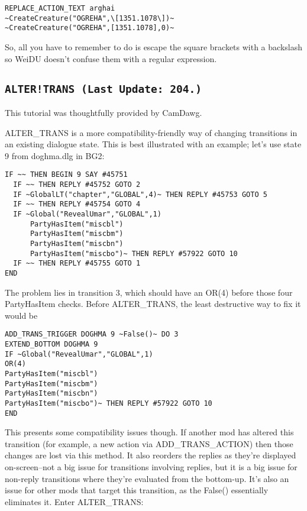 \documentclass{article}
\begin{document}
\begin{verbatim}
REPLACE_ACTION_TEXT arghai
~CreateCreature("OGREHA",\[1351.1078\])~
~CreateCreature("OGREHA",[1351.1078],0)~
\end{verbatim}

So, all you have to remember to do is escape the square brackets with a
backslash so WeiDU doesn't confuse them with a regular expression.

\label{sec-alter-trans}\subsection{\tt{ALTER!TRANS} (Last Update: 204.)}
This tutorial was thoughtfully provided by CamDawg.

ALTER_TRANS is a more compatibility-friendly way of changing transitions in an existing dialogue state. This is best illustrated with an example; let's use state 9 from doghma.dlg in BG2:

\begin{verbatim}
IF ~~ THEN BEGIN 9 SAY #45751
  IF ~~ THEN REPLY #45752 GOTO 2
  IF ~GlobalLT("chapter","GLOBAL",4)~ THEN REPLY #45753 GOTO 5
  IF ~~ THEN REPLY #45754 GOTO 4
  IF ~Global("RevealUmar","GLOBAL",1)
      PartyHasItem("miscbl")
      PartyHasItem("miscbm")
      PartyHasItem("miscbn")
      PartyHasItem("miscbo")~ THEN REPLY #57922 GOTO 10
  IF ~~ THEN REPLY #45755 GOTO 1
END
\end{verbatim}


The problem lies in transition 3, which should have an OR(4) before those four PartyHasItem checks. Before ALTER_TRANS, the least destructive way to fix it would be

\begin{verbatim}
ADD_TRANS_TRIGGER DOGHMA 9 ~False()~ DO 3
EXTEND_BOTTOM DOGHMA 9
IF ~Global("RevealUmar","GLOBAL",1)
OR(4)
PartyHasItem("miscbl")
PartyHasItem("miscbm")
PartyHasItem("miscbn")
PartyHasItem("miscbo")~ THEN REPLY #57922 GOTO 10
END
\end{verbatim}


This presents some compatibility issues though. If another mod has altered this transition (for example, a new action via ADD_TRANS_ACTION) then those changes are lost via this method. It also reorders the replies as they're displayed on-screen--not a big issue for transitions involving replies, but it is a big issue for non-reply transitions where they're evaluated from the bottom-up. It's also an issue for other mods that target this transition, as the False() essentially eliminates it. Enter ALTER_TRANS:
\end{document}

